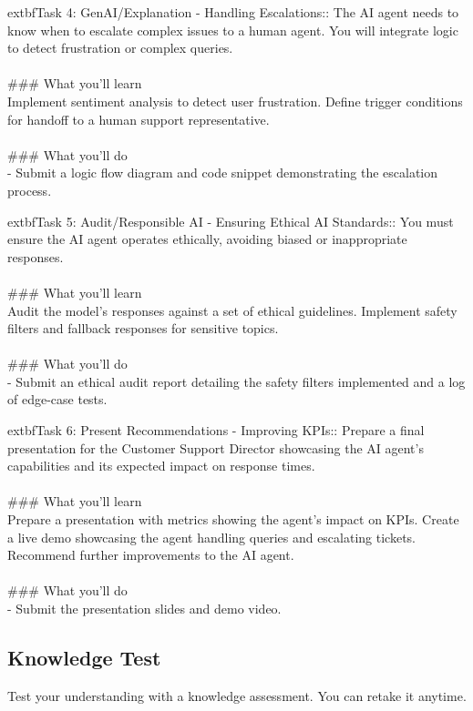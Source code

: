 \documentclass{article}
\begin{document}
	extbf{Task 4:} GenAI/Explanation - Handling Escalations:: The AI agent needs to know when to escalate complex issues to a human agent. You will integrate logic to detect frustration or complex queries. \\
 \\
### What you'll learn \\
Implement sentiment analysis to detect user frustration. Define trigger conditions for handoff to a human support representative. \\
 \\
### What you'll do \\
- Submit a logic flow diagram and code snippet demonstrating the escalation process.

	extbf{Task 5:} Audit/Responsible AI - Ensuring Ethical AI Standards:: You must ensure the AI agent operates ethically, avoiding biased or inappropriate responses. \\
 \\
### What you'll learn \\
Audit the model's responses against a set of ethical guidelines. Implement safety filters and fallback responses for sensitive topics. \\
 \\
### What you'll do \\
- Submit an ethical audit report detailing the safety filters implemented and a log of edge-case tests.

	extbf{Task 6:} Present Recommendations - Improving KPIs:: Prepare a final presentation for the Customer Support Director showcasing the AI agent's capabilities and its expected impact on response times. \\
 \\
### What you'll learn \\
Prepare a presentation with metrics showing the agent's impact on KPIs. Create a live demo showcasing the agent handling queries and escalating tickets. Recommend further improvements to the AI agent. \\
 \\
### What you'll do \\
- Submit the presentation slides and demo video.

\subsection*{Knowledge Test}
Test your understanding with a knowledge assessment. You can retake it anytime.\\
\end{document}
